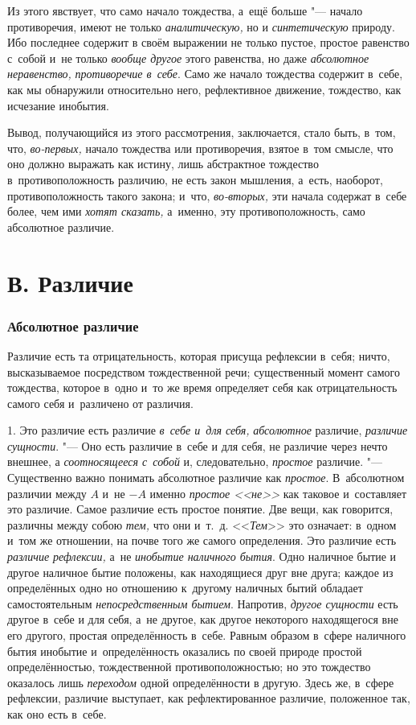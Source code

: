 Из этого явствует, что само начало тождества, а~ещё больше "--- начало
противоречия, имеют не только {\em аналитическую,} но и
{\em синтетическую} природу. Ибо последнее содержит в
своём выражении не только пустое, простое равенство с~собой и~не только
{\em вообще другое} этого равенства, но даже
{\em абсолютное неравенство,}
{\em противоречие в~себе}. Само же начало тождества
содержит в~себе, как мы обнаружили относительно него, рефлективное
движение, тождество, как исчезание инобытия.

Вывод, получающийся из этого рассмотрения, заключается, стало быть, в~том,
что, {\em во-первых,} начало тождества или
противоречия, взятое в~том смысле, что оно должно выражать как истину, лишь
абстрактное тождество в~противоположность различию, не есть закон мышления,
а~есть, наоборот, противоположность такого закона; и~что,
{\em во-вторых,} эти начала содержат в~себе более, чем
ими {\em хотят сказать,} а~именно, эту
противоположность, само абсолютное различие.

\section[В. Различие]{В. Различие}
\subsubsection{Абсолютное различие}
Различие есть та отрицательность, которая
присуща рефлексии в~себя; ничто, высказываемое посредством тождественной
речи; существенный момент самого тождества, которое в~одно и~то же время
определяет себя как отрицательность самого себя и~различено от различия.

1. Это различие есть различие {\em в~себе и~для себя,}
{\em абсолютное} различие,
{\em различие сущности}. "--- Оно есть различие в~себе и
для себя, не различие через нечто внешнее, а
{\em соотносящееся с~собой} и, следовательно,
{\em простое} различие. "--- Существенно важно понимать
абсолютное различие как {\em простое}. В~абсолютном
различии между $A$ и~не $-A$ именно
{\em простое <<не>>} как таковое и~составляет это
различие. Самое различие есть простое понятие. Две вещи, как говорится,
различны между собою {\em тем,} что они и~т.~д.
<<{\em Тем}>> это означает: в~одном и~том же отношении,
на почве того же самого определения. Это различие есть
{\em различие рефлексии,} а~не
{\em инобытие наличного бытия}. Одно наличное бытие и
другое наличное бытие положены, как находящиеся друг вне друга; каждое из
определённых одно но отношению к~другому наличных бытий обладает
самостоятельным {\em непосредственным бытием}.
Напротив, {\em другое сущности} есть другое в~себе и
для себя, а~не другое, как другое некоторого находящегося вне его другого,
простая определённость в~себе. Равным образом в~сфере наличного бытия
инобытие и~определённость оказались по своей природе простой
определённостью, тождественной противоположностью; но это тождество
оказалось лишь {\em переходом} одной определённости в
другую. Здесь же, в~сфере рефлексии, различие выступает, как
рефлектированное различие, положенное так, как оно есть в~себе.

